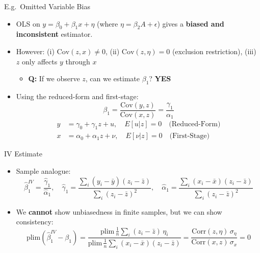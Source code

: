 \documentclass[9pt]{beamer}
\begin{document}
\begin{frame}{E.g.\ Omitted Variable Bias}
  \begin{itemize}
    \item OLS on $y = \beta_0 + \beta_1 x + \eta$ (where $\eta = \beta_2 A + \epsilon$) gives a \textbf{biased and inconsistent} estimator.
    \medskip
    \item However: (i) $\mathrm{Cov}(z,x)\neq 0$, \;(ii) $\mathrm{Cov}(z,\eta)=0$ (\textcolor{slideblue}{exclusion restriction}), \;(iii) $z$ only affects $y$ through $x$
    \begin{itemize}
      \item[$\blacktriangleright$] \textbf{Q:} If we observe $z$, can we estimate $\beta_1$? \;\textcolor{slideblue}{\textbf{YES}}
    \end{itemize}
    \medskip
    \item Using the reduced-form and first-stage:
    \[
      \beta_1 = \frac{\mathrm{Cov}(y,z)}{\mathrm{Cov}(x,z)} = \frac{\gamma_1}{\alpha_1}
    \]
    \begin{align*}
      y &= \gamma_0 + \gamma_1 z + u, \quad E[u|z]=0 \quad \text{(Reduced-Form)}\\
      x &= \alpha_0 + \alpha_1 z + \nu, \quad E[\nu|z]=0 \quad \text{(First-Stage)}
    \end{align*}
  \end{itemize}
\end{frame}

\begin{frame}{IV Estimate}
  \begin{itemize}
    \item Sample analogue:
    \[
      \hat{\beta}_1^{IV} = \frac{\hat{\gamma}_1}{\hat{\alpha}_1}, \quad
      \hat{\gamma}_1 = \frac{\sum_{i}(y_i-\bar{y})(z_i-\bar{z})}{\sum_{i}(z_i-\bar{z})^2}, \quad
      \hat{\alpha}_1 = \frac{\sum_{i}(x_i-\bar{x})(z_i-\bar{z})}{\sum_{i}(z_i-\bar{z})^2}
    \]
    \medskip
    \item We \textbf{cannot} show unbiasedness in finite samples, but we can show consistency:
    \[
      \mathrm{plim}\!\left(\hat{\beta}_1^{IV} - \beta_1\right)
      = \frac{\mathrm{plim}\,\frac{1}{n}\sum_{i}(z_i-\bar{z})\,\eta_i}
             {\mathrm{plim}\,\frac{1}{n}\sum_{i}(x_i-\bar{x})(z_i-\bar{z})}
      = \frac{\mathrm{Corr}(z,\eta)\,\sigma_\eta}{\mathrm{Corr}(x,z)\,\sigma_x} = 0
    \]
  \end{itemize}
\end{frame}
\end{document}
